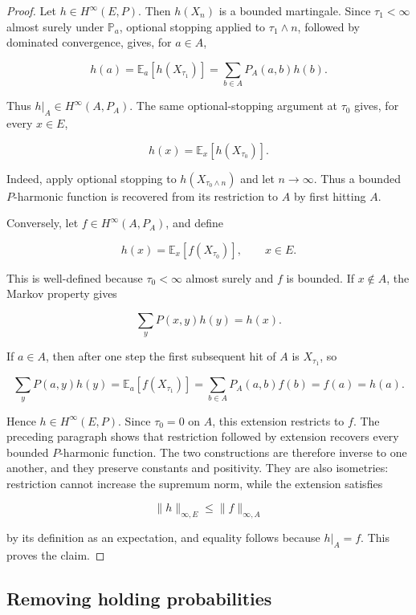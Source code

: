 \documentclass[11pt,a4paper]{scrartcl}
\begin{document}
\begin{proof}
Let \(h\in H^\infty(E,P)\). Then \(h(X_n)\) is a bounded martingale.
Since \(\tau_1<\infty\) almost surely under \(\mathbb P_a\), optional
stopping applied to \(\tau_1\wedge n\), followed by dominated convergence,
gives, for \(a\in A\),

\[
h(a)=\mathbb E_a[h(X_{\tau_1})]
=\sum_{b\in A}P_A(a,b)h(b).
\]

Thus \(h|_A\in H^\infty(A,P_A)\).
The same optional-stopping argument at \(\tau_0\) gives, for every \(x\in E\),

\[
h(x)=\mathbb E_x[h(X_{\tau_0})].
\]

Indeed, apply optional stopping to \(h(X_{\tau_0\wedge n})\) and let
\(n\to\infty\).  Thus a bounded \(P\)-harmonic function is recovered from its
restriction to \(A\) by first hitting \(A\).

Conversely, let \(f\in H^\infty(A,P_A)\), and define

\[
h(x)=\mathbb E_x[f(X_{\tau_0})],
\qquad x\in E .
\]

This is well-defined because \(\tau_0<\infty\) almost surely and \(f\) is
bounded. If \(x\notin A\), the Markov property gives

\[
\sum_y P(x,y)h(y)=h(x).
\]

If \(a\in A\), then after one step the first subsequent hit of \(A\) is
\(X_{\tau_1}\), so

\[
\sum_y P(a,y)h(y)
=
\mathbb E_a[f(X_{\tau_1})]
=
\sum_{b\in A}P_A(a,b)f(b)
=f(a)
=h(a).
\]

Hence \(h\in H^\infty(E,P)\). Since \(\tau_0=0\) on \(A\), this extension
restricts to \(f\). The preceding paragraph shows that restriction followed by
extension recovers every bounded \(P\)-harmonic function. The two
constructions are therefore inverse to one another, and they preserve constants
and positivity. They are also isometries: restriction cannot increase the
supremum norm, while the extension satisfies

\[
\|h\|_{\infty,E}\le \|f\|_{\infty,A}
\]

by its definition as an expectation, and equality follows because \(h|_A=f\).
This proves the claim.
\end{proof}


\subsection{Removing holding probabilities}\label{subsec:removing-holding-probabilities}
\end{document}
